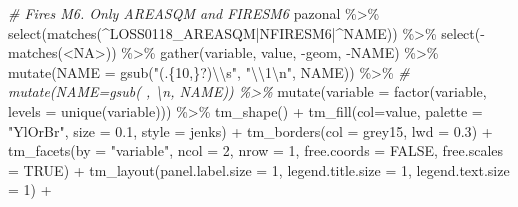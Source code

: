 \documentclass[10pt,landscape,a3paper]{article}
\newenvironment{Shaded}{\begin{snugshade}}{\end{snugshade}}
\newcommand{\AttributeTok}[1]{\textcolor[rgb]{0.77,0.63,0.00}{#1}}
\newcommand{\CommentTok}[1]{\textcolor[rgb]{0.56,0.35,0.01}{\textit{#1}}}
\newcommand{\ConstantTok}[1]{\textcolor[rgb]{0.00,0.00,0.00}{#1}}
\newcommand{\DecValTok}[1]{\textcolor[rgb]{0.00,0.00,0.81}{#1}}
\newcommand{\FloatTok}[1]{\textcolor[rgb]{0.00,0.00,0.81}{#1}}
\newcommand{\FunctionTok}[1]{\textcolor[rgb]{0.00,0.00,0.00}{#1}}
\newcommand{\NormalTok}[1]{#1}
\newcommand{\SpecialCharTok}[1]{\textcolor[rgb]{0.00,0.00,0.00}{#1}}
\newcommand{\StringTok}[1]{\textcolor[rgb]{0.31,0.60,0.02}{#1}}
\begin{document}
\begin{Shaded}
\begin{Highlighting}[]

\CommentTok{\# Fires M6. Only AREASQM and FIRESM6}
\NormalTok{pazonal }\SpecialCharTok{\%\textgreater{}\%} \FunctionTok{select}\NormalTok{(}\FunctionTok{matches}\NormalTok{(}\StringTok{\textquotesingle{}\^{}LOSS0118\_AREASQM|NFIRESM6|\^{}NAME\textquotesingle{}}\NormalTok{)) }\SpecialCharTok{\%\textgreater{}\%} \FunctionTok{select}\NormalTok{(}\SpecialCharTok{{-}}\FunctionTok{matches}\NormalTok{(}\StringTok{\textquotesingle{}\textless{}NA\textgreater{}\textquotesingle{}}\NormalTok{)) }\SpecialCharTok{\%\textgreater{}\%} 
  \FunctionTok{gather}\NormalTok{(variable, value, }\SpecialCharTok{{-}}\NormalTok{geom, }\SpecialCharTok{{-}}\NormalTok{NAME) }\SpecialCharTok{\%\textgreater{}\%}
  \FunctionTok{mutate}\NormalTok{(}\AttributeTok{NAME =} \FunctionTok{gsub}\NormalTok{(}\StringTok{"(.\{10,\}?)}\SpecialCharTok{\textbackslash{}\textbackslash{}}\StringTok{s"}\NormalTok{, }\StringTok{"}\SpecialCharTok{\textbackslash{}\textbackslash{}}\StringTok{1}\SpecialCharTok{\textbackslash{}n}\StringTok{"}\NormalTok{, NAME)) }\SpecialCharTok{\%\textgreater{}\%} 
  \CommentTok{\# mutate(NAME=gsub(\textquotesingle{} \textquotesingle{}, \textquotesingle{}\textbackslash{}n\textquotesingle{}, NAME)) \%\textgreater{}\% }
  \FunctionTok{mutate}\NormalTok{(}\AttributeTok{variable =} \FunctionTok{factor}\NormalTok{(variable, }\AttributeTok{levels =} \FunctionTok{unique}\NormalTok{(variable))) }\SpecialCharTok{\%\textgreater{}\%} 
  \FunctionTok{tm\_shape}\NormalTok{() }\SpecialCharTok{+}
  \FunctionTok{tm\_fill}\NormalTok{(}\AttributeTok{col=}\StringTok{\textquotesingle{}value\textquotesingle{}}\NormalTok{, }\AttributeTok{palette =} \StringTok{"YlOrBr"}\NormalTok{, }\AttributeTok{size =} \FloatTok{0.1}\NormalTok{, }\AttributeTok{style =} \StringTok{\textquotesingle{}jenks\textquotesingle{}}\NormalTok{) }\SpecialCharTok{+}
  \FunctionTok{tm\_borders}\NormalTok{(}\AttributeTok{col =} \StringTok{\textquotesingle{}grey15\textquotesingle{}}\NormalTok{, }\AttributeTok{lwd =} \FloatTok{0.3}\NormalTok{) }\SpecialCharTok{+}
  \FunctionTok{tm\_facets}\NormalTok{(}\AttributeTok{by =} \StringTok{"variable"}\NormalTok{, }\AttributeTok{ncol =} \DecValTok{2}\NormalTok{, }\AttributeTok{nrow =} \DecValTok{1}\NormalTok{, }\AttributeTok{free.coords =} \ConstantTok{FALSE}\NormalTok{, }\AttributeTok{free.scales =} \ConstantTok{TRUE}\NormalTok{) }\SpecialCharTok{+}
  \FunctionTok{tm\_layout}\NormalTok{(}\AttributeTok{panel.label.size =} \DecValTok{1}\NormalTok{, }\AttributeTok{legend.title.size =} \DecValTok{1}\NormalTok{, }\AttributeTok{legend.text.size =} \DecValTok{1}\NormalTok{) }\SpecialCharTok{+}

\end{Highlighting}
\end{Shaded}
\end{document}
